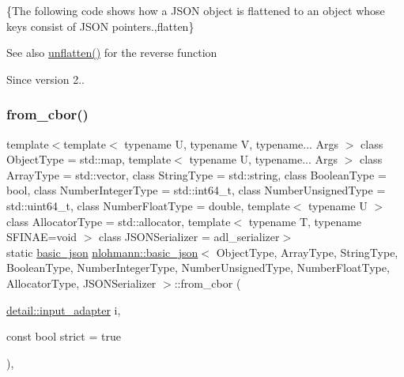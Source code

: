 \{The following code shows how a J\+S\+ON object is flattened to an object whose keys consist of J\+S\+ON pointers.,flatten\}

\begin{DoxySeeAlso}{See also}
\mbox{\hyperlink{classnlohmann_1_1basic__json_a74fa3ab2003f2f6f2b69deaafed9126d}{unflatten()}} for the reverse function
\end{DoxySeeAlso}
\begin{DoxySince}{Since}
version 2.. 
\end{DoxySince}
\mbox{\label{classnlohmann_1_1basic__json_aa9be366b887378bb10c0f1ab510c2f0c}} 
\subsubsection{\texorpdfstring{from\+\_\+cbor()}{from\_cbor()}\hspace{0.1cm}{\footnotesize\ttfamily [1/2]}}
{\footnotesize\ttfamily template$<$template$<$ typename U, typename V, typename... Args $>$ class Object\+Type = std\+::map, template$<$ typename U, typename... Args $>$ class Array\+Type = std\+::vector, class String\+Type  = std\+::string, class Boolean\+Type  = bool, class Number\+Integer\+Type  = std\+::int64\+\_\+t, class Number\+Unsigned\+Type  = std\+::uint64\+\_\+t, class Number\+Float\+Type  = double, template$<$ typename U $>$ class Allocator\+Type = std\+::allocator, template$<$ typename T, typename S\+F\+I\+N\+A\+E=void $>$ class J\+S\+O\+N\+Serializer = adl\+\_\+serializer$>$ \\
static \mbox{\hyperlink{classnlohmann_1_1basic__json}{basic\+\_\+json}} \mbox{\hyperlink{classnlohmann_1_1basic__json}{nlohmann\+::basic\+\_\+json}}$<$ Object\+Type, Array\+Type, String\+Type, Boolean\+Type, Number\+Integer\+Type, Number\+Unsigned\+Type, Number\+Float\+Type, Allocator\+Type, J\+S\+O\+N\+Serializer $>$\+::from\+\_\+cbor (\begin{DoxyParamCaption}\item[{\mbox{\hyperlink{classnlohmann_1_1detail_1_1input__adapter}{detail\+::input\+\_\+adapter}}}]{i,  }\item[{const bool}]{strict = {\ttfamily true} }\end{DoxyParamCaption})\hspace{0.3cm}{\ttfamily [inline]}, {\ttfamily [static]}}



